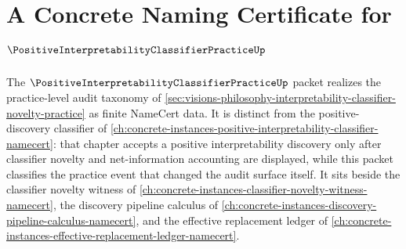 \chapter{A Concrete Naming Certificate for $\PositiveInterpretabilityClassifierPracticeUp$}
\label{ch:concrete-instances-positive-interpretability-classifier-practice-namecert}

The $\PositiveInterpretabilityClassifierPracticeUp$ packet realizes the practice-level audit taxonomy of \autoref{sec:visions-philosophy-interpretability-classifier-novelty-practice} as finite NameCert data. It is distinct from the positive-discovery classifier of \autoref{ch:concrete-instances-positive-interpretability-classifier-namecert}: that chapter accepts a positive interpretability discovery only after classifier novelty and net-information accounting are displayed, while this packet classifies the practice event that changed the audit surface itself. It sits beside the classifier novelty witness of \autoref{ch:concrete-instances-classifier-novelty-witness-namecert}, the discovery pipeline calculus of \autoref{ch:concrete-instances-discovery-pipeline-calculus-namecert}, and the effective replacement ledger of \autoref{ch:concrete-instances-effective-replacement-ledger-namecert}.

